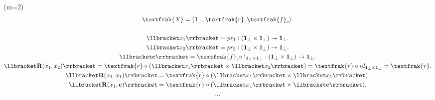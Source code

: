 		 \begin{ex} (m=2)
		 	\begin{gather*}
			 		\textfrak{X}= \langle \textbf{1}_\bot, \textfrak{r}, \textfrak{f}_c \rangle. \\ \\
			 		\llbracket x_1 \rrbracket = {pr_1} : (\textbf{1}_\bot \times \textbf{1}_\bot) \rightarrow \textbf{1}_\bot. \\
			 		\llbracket x_2 \rrbracket = {pr_2} : (\textbf{1}_\bot \times \textbf{1}_\bot) \rightarrow \textbf{1}_\bot. \\
			 		\llbracket \textbf{c} \rrbracket = \textfrak{f}_c \circ \; !_{\textbf{1}_\bot \times \textbf{1}_\bot} : (\textbf{1}_\bot \times \textbf{1}_\bot) \rightarrow \textbf{1}_\bot.  \\
			 		\llbracket \textbf{R}(x_1,x_2) \rrbracket = \textfrak{r} \circ (\llbracket x_1 \rrbracket \times \llbracket x_2 \rrbracket) = \textfrak{r} \circ id_{\textbf{1}_\bot \times \textbf{1}_\bot} = \textfrak{r}. \\
			 		\llbracket \textbf{R}(x_1,x_1) \rrbracket = \textfrak{r} \circ (\llbracket x_1 \rrbracket \times \llbracket x_1 \rrbracket). \\
			 		\llbracket \textbf{R}(x_1,\textbf{c}) \rrbracket = \textfrak{r} \circ (\llbracket x_1 \rrbracket \times \llbracket \textbf{c} \rrbracket). \\
			 		...
			 	\end{gather*}
		 \end{ex}
		 
		 
		 
